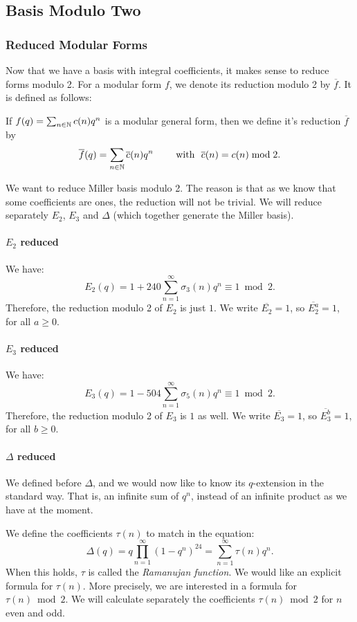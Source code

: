 \subsection{Basis Modulo Two}
\subsubsection{Reduced Modular Forms}
Now that we have a basis with integral coefficients, it makes sense to reduce forms modulo 2.
For a modular form $f$, we denote its reduction modulo 2 by $\overline{f}$. It is defined as follows:

If $f(q) = \sum_{n \in \mathbb{N}} c(n)q^n$ is a modular general form, then we define it's reduction $\overline{f}$ by
$$
\overline{f}(q) = \sum_{n \in \mathbb{N}} \overline{c}(n)q^n 
\qquad \text{ with } \ \overline{c}(n) = c(n) \bmod 2 .
$$

We want to reduce Miller basis modulo 2.
The reason is that as we know that some coefficients are ones, the reduction will not be trivial.
We will reduce separately $E_2$, $E_3$ and $\Delta$ (which together generate the Miller basis).

\paragraph{$E_2$ reduced}
We have:
$$
E_2(q) = 1 + 240 \sum_{n=1}^{\infty} \sigma_{3}(n)q^n \equiv 1 \bmod 2.
$$
Therefore, the reduction modulo 2 of $E_2$ is just $1$.
We write $\overline{E_2} = 1$, so $\overline{E_2^a} = 1$, for all $a \geq 0$.

\paragraph{$E_3$ reduced}
We have:
$$
E_3(q) = 1 - 504 \sum_{n=1}^{\infty} \sigma_{5}(n)q^n \equiv 1 \bmod 2.
$$
Therefore, the reduction modulo 2 of $E_3$ is $1$ as well.
We write $\overline{E_3} = 1$, so $\overline{E_3^b} = 1$, for all $b \geq 0$.

\paragraph{$\Delta$ reduced}
We defined before $\Delta$, and we would now like to know its $q$-extension in the standard way.
That is, an infinite sum of $q^n$, instead of an infinite product as we have at the moment.

We define the coefficients $\tau(n)$ to match in the equation: 
$$
\Delta(q) 
= q \prod_{n=1}^{\infty} (1-q^n)^{24} 
= \sum_{n=1}^{\infty} \tau(n)q^n.
$$
When this holds, $\tau$ is called the \textit{Ramanujan function}.
We would like an explicit formula for $\tau(n)$. More precisely, we are interested in a formula for $\tau(n) \bmod 2$.
We will calculate separately the coefficients $\tau(n) \bmod 2$ for $n$ even and odd.

